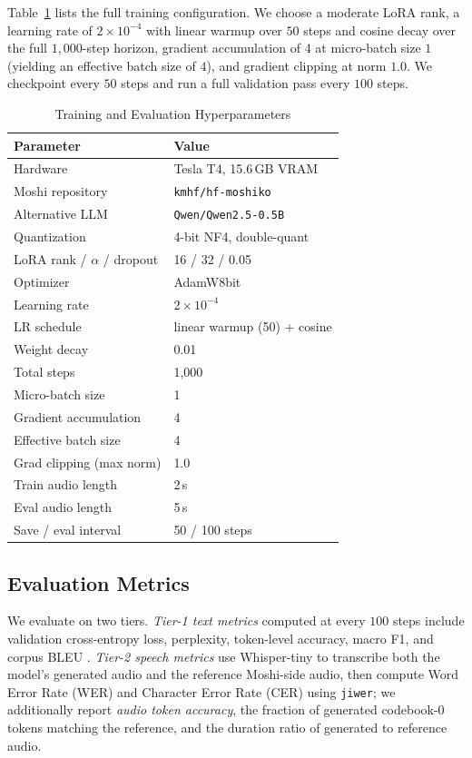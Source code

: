 \documentclass[conference]{IEEEtran}
\begin{document}
Table~\ref{tab:hyperparams} lists the full training configuration. We choose a moderate LoRA rank, a learning rate of $2 \times 10^{-4}$ with linear warmup over $50$ steps and cosine decay over the full $1{,}000$-step horizon, gradient accumulation of $4$ at micro-batch size $1$ (yielding an effective batch size of $4$), and gradient clipping at norm $1.0$. We checkpoint every $50$ steps and run a full validation pass every $100$ steps.

\begin{table}[t]
\caption{Training and Evaluation Hyperparameters}
\label{tab:hyperparams}
\centering
\begin{tabular}{ll}
\toprule
\textbf{Parameter} & \textbf{Value} \\
\midrule
Hardware & Tesla T4, 15.6\,GB VRAM \\
Moshi repository & \texttt{kmhf/hf-moshiko} \\
Alternative LLM & \texttt{Qwen/Qwen2.5-0.5B} \\
Quantization & 4-bit NF4, double-quant \\
LoRA rank / $\alpha$ / dropout & 16 / 32 / 0.05 \\
Optimizer & AdamW8bit \\
Learning rate & $2 \times 10^{-4}$ \\
LR schedule & linear warmup (50) + cosine \\
Weight decay & 0.01 \\
Total steps & 1{,}000 \\
Micro-batch size & 1 \\
Gradient accumulation & 4 \\
Effective batch size & 4 \\
Grad clipping (max norm) & 1.0 \\
Train audio length & 2\,s \\
Eval audio length & 5\,s \\
Save / eval interval & 50 / 100 steps \\
\bottomrule
\end{tabular}
\end{table}

\subsection{Evaluation Metrics}

We evaluate on two tiers. \emph{Tier-1 text metrics} computed at every $100$ steps include validation cross-entropy loss, perplexity, token-level accuracy, macro F1, and corpus BLEU \cite{bleu2002}. \emph{Tier-2 speech metrics} use Whisper-tiny \cite{whisper2023} to transcribe both the model's generated audio and the reference Moshi-side audio, then compute Word Error Rate (WER) and Character Error Rate (CER) using \texttt{jiwer}; we additionally report \emph{audio token accuracy}, the fraction of generated codebook-0 tokens matching the reference, and the duration ratio of generated to reference audio.
\end{document}
